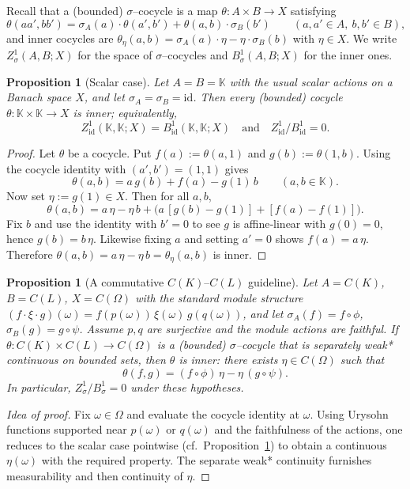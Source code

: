 \documentclass{article}
\theoremstyle{plain}
\newtheorem{prop}[theorem]{Proposition}
\theoremstyle{definition}
\begin{document}
Recall that a (bounded) $\sigma$–cocycle is a map $\theta:A\times B\to X$
satisfying
\[
\theta(aa',bb')=\sigma_A(a)\cdot \theta(a',b')+\theta(a,b)\cdot \sigma_B(b')\qquad(a,a'\in A,\ b,b'\in B),
\]
and inner cocycles are $\theta_\eta(a,b)=\sigma_A(a)\cdot\eta-\eta\cdot\sigma_B(b)$ with $\eta\in X$.
We write $Z_\sigma^1(A,B;X)$ for the space of $\sigma$–cocycles and
$B_\sigma^1(A,B;X)$ for the inner ones.

\begin{prop}[Scalar case]\label{prop:Z1-scalar}
Let $A=B=\mathbb{K}$ with the usual scalar actions on a Banach space $X$, and let $\sigma_A=\sigma_B=\mathrm{id}$.
Then every (bounded) cocycle $\theta:\mathbb{K}\times\mathbb{K}\to X$ is inner; equivalently,
\[
Z^1_{\mathrm{id}}(\mathbb{K},\mathbb{K};X)=B^1_{\mathrm{id}}(\mathbb{K},\mathbb{K};X)
\quad\text{and}\quad Z^1_{\mathrm{id}}/B^1_{\mathrm{id}}=0.
\]
\end{prop}

\begin{proof}
Let $\theta$ be a cocycle.
Put $f(a):=\theta(a,1)$ and $g(b):=\theta(1,b)$.
Using the cocycle identity with $(a',b')=(1,1)$ gives
\[
\theta(a,b)=a\,g(b)+f(a)-g(1)\,b\qquad(a,b\in\mathbb{K}).
\]
Now set $\eta:=g(1)\in X$.
Then for all $a,b$,
\[
\theta(a,b)=a\,\eta-\eta\,b + \big(a\,[g(b)-g(1)] + [f(a)-f(1)]\big).
\]
Fix $b$ and use the identity with $b'=0$ to see $g$ is affine‐linear with $g(0)=0$, hence $g(b)=b\,\eta$.
Likewise fixing $a$ and setting $a'=0$ shows $f(a)=a\,\eta$.
Therefore $\theta(a,b)=a\,\eta-\eta\,b=\theta_\eta(a,b)$ is inner.
\end{proof}

\begin{prop}[A commutative $C(K)$--$C(L)$ guideline]\label{prop:Z1-CK}
Let $A=C(K)$, $B=C(L)$, $X=C(\Omega)$ with the standard module structure
$(f\cdot\xi\cdot g)(\omega)=f(p(\omega))\,\xi(\omega)\,g(q(\omega))$,
and let $\sigma_A(f)=f\circ\phi$, $\sigma_B(g)=g\circ\psi$.
Assume $p,q$ are surjective and the module actions are faithful.
If $\theta:C(K)\times C(L)\to C(\Omega)$ is a (bounded) $\sigma$–cocycle that is separately weak* continuous on bounded sets, then $\theta$ is inner:
there exists $\eta\in C(\Omega)$ such that
\[
\theta(f,g)= (f\circ\phi)\,\eta - \eta\,(g\circ\psi).
\]
In particular, $Z^1_\sigma/B^1_\sigma=0$ under these hypotheses.
\end{prop}

\begin{proof}[Idea of proof]
Fix $\omega\in\Omega$ and evaluate the cocycle identity at $\omega$.
Using Urysohn functions supported near $p(\omega)$ or $q(\omega)$ and the faithfulness of the actions, one reduces to the scalar case pointwise (cf.\ Proposition~\ref{prop:Z1-scalar}) to obtain a continuous $\eta(\omega)$ with the required property.
The separate weak* continuity furnishes measurability and then continuity of $\eta$.
\end{proof}
\end{document}
